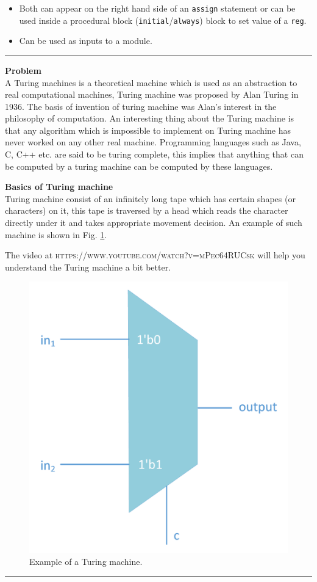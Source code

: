 \documentclass[a4paper,10pt]{article}
\theoremstyle{mytheor}
\newcounter{problemNumber}
\newcommand {
  \insertProblem}[1]{
  \vspace{0.5cm}
  \hrule
  \vspace{0.3cm}

  {\color{greatblue}\textbf{\large{Problem \theproblemNumber}}}
  \vspace{2pt}\\#1

  \addtocounter{problemNumber}{1}
  \vspace{0.2cm}
  \hrule  
  \vspace{0.5cm}
}
\begin{document}
 \begin{itemize}
 \item Both can appear on the right hand side of an \lstinline[style=verilog-inline-style]{assign} statement or can be used inside a procedural block (\lstinline[style=verilog-inline-style]{initial}/\lstinline[style=verilog-inline-style]{always}) block to set value of a \lstinline[style=verilog-inline-style]{reg}.
 \item Can be used as inputs to a module.
\end{itemize}


 \insertProblem { A Turing machines is a theoretical machine which is
   used as an abstraction to real computational machines, Turing
   machine was proposed by Alan Turing in 1936. The basis of invention
   of turing machine was Alan's interest in the philosophy of
   computation. An interesting thing about the Turing machine is that
   any algorithm which is impossible to implement on Turing machine
   has never worked on any other real machine. Programming languages
   such as Java, C, C++ etc. are said to be turing complete, this
   implies that anything that can be computed by a turing machine can
   be computed by these languages.

   \textbf{Basics of Turing machine}\\ Turing machine consist of an
   infinitely long tape which has certain shapes (or characters) on
   it, this tape is traversed by a head which reads the character
   directly under it and takes appropriate movement decision. An
   example of such machine is shown in
   Fig. \ref{Fig:turing-machine-example}.

   The video at \textsc{https://www.youtube.com/watch?v=mPec64RUCsk}
   will help you understand the Turing machine a bit better.

  \begin{figure}[!h] \centering  
    \includegraphics[width=0.3\linewidth]{./resources/multiplexer.pdf} 
    \caption{Example of a Turing machine.} 
    \label{Fig:turing-machine-example} 
  \end{figure}

}
\end{document}
